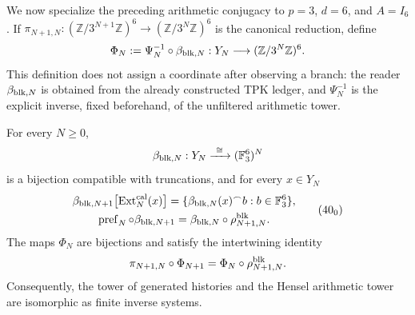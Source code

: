 We now specialize the preceding arithmetic conjugacy to
\(p=3\), \(d=6\), and \(A=I_6\). If
\(\pi_{N+1,N}:(\mathbb Z/3^{N+1}\mathbb Z)^6\to
(\mathbb Z/3^N\mathbb Z)^6\) is the canonical reduction, define
\begin{equation}
 \Phi_N:=\Psi_N^{-1}\circ\beta_{{\rm blk},N}:
 Y_N\longrightarrow(\mathbb Z/3^N\mathbb Z)^6.
 \label{ix:eq:phi-hensel-bloques-ch}
\end{equation}
This definition does not assign a coordinate after observing a branch: the
reader \(\beta_{{\rm blk},N}\) is obtained from the already constructed TPK ledger, and
\(\Psi_N^{-1}\) is the explicit inverse, fixed beforehand, of the
unfiltered arithmetic tower.

\begin{proposition}
\label{ix:prop:cobertura-729-seccion}
For every \(N\geq0\),
\[
 \beta_{{\rm blk},N}:Y_N\xrightarrow{\ \cong\ }
 (\mathbb F_3^6)^N
\]
is a bijection compatible with truncations, and for every \(x\in Y_N\)
\[
 \begin{gathered}
 \beta_{{\rm blk},N+1}
 \bigl[\operatorname{Ext}^{\rm cal}_N(x)\bigr]
 =\{\beta_{{\rm blk},N}(x)^\frown b:
       b\in\mathbb F_3^6\},\\
 \operatorname{pref}_N\circ\beta_{{\rm blk},N+1}
 =\beta_{{\rm blk},N}\circ\rho^{\rm blk}_{N+1,N}.
 \end{gathered}
\tag{40$_0$}
\label{ix:eq:cobertura-729-ch}
\]
The maps \(\Phi_N\) are bijections and satisfy the intertwining identity
\begin{equation}
 \pi_{N+1,N}\circ\Phi_{N+1}
 =\Phi_N\circ\rho^{\rm blk}_{N+1,N}.
 \label{ix:eq:entrelazamiento-hensel-ext-ch}
\end{equation}
Consequently, the tower of generated histories and the Hensel arithmetic
tower are isomorphic as finite inverse systems.
\end{proposition}

